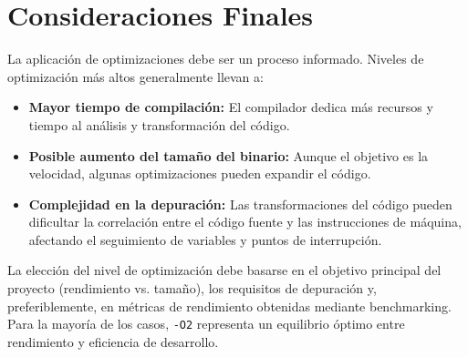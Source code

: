 \documentclass{article}
\begin{document}
	\section{Consideraciones Finales}
	La aplicación de optimizaciones debe ser un proceso informado. Niveles de optimización más altos generalmente llevan a:
	\begin{itemize}[leftmargin=*,noitemsep,topsep=0pt]
		\item \textbf{Mayor tiempo de compilación:} El compilador dedica más recursos y tiempo al análisis y transformación del código.
		\item \textbf{Posible aumento del tamaño del binario:} Aunque el objetivo es la velocidad, algunas optimizaciones pueden expandir el código.
		\item \textbf{Complejidad en la depuración:} Las transformaciones del código pueden dificultar la correlación entre el código fuente y las instrucciones de máquina, afectando el seguimiento de variables y puntos de interrupción.
	\end{itemize}
	La elección del nivel de optimización debe basarse en el objetivo principal del proyecto (rendimiento vs. tamaño), los requisitos de depuración y, preferiblemente, en métricas de rendimiento obtenidas mediante benchmarking. Para la mayoría de los casos, \texttt{-O2} representa un equilibrio óptimo entre rendimiento y eficiencia de desarrollo.
	
\end{document}
